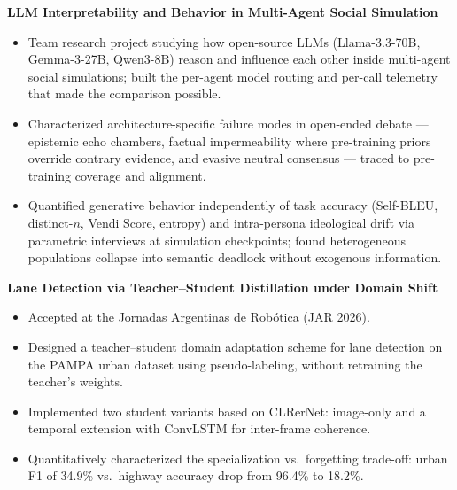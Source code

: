 \documentclass[a4paper,11pt]{article}
\begin{document}
\textbf{LLM Interpretability and Behavior in Multi-Agent Social Simulation}
\begin{itemize}
    \item Team research project studying how open-source LLMs (Llama-3.3-70B, Gemma-3-27B, Qwen3-8B) reason and influence each other inside multi-agent social simulations; built the per-agent model routing and per-call telemetry that made the comparison possible.
    \item Characterized architecture-specific failure modes in open-ended debate --- epistemic echo chambers, factual impermeability where pre-training priors override contrary evidence, and evasive neutral consensus --- traced to pre-training coverage and alignment.
    \item Quantified generative behavior independently of task accuracy (Self-BLEU, distinct-$n$, Vendi Score, entropy) and intra-persona ideological drift via parametric interviews at simulation checkpoints; found heterogeneous populations collapse into semantic deadlock without exogenous information.
\end{itemize}

\textbf{Lane Detection via Teacher--Student Distillation under Domain Shift}
\begin{itemize}
    \item Accepted at the Jornadas Argentinas de Robótica (JAR 2026).
    \item Designed a teacher--student domain adaptation scheme for lane detection on the PAMPA urban dataset using pseudo-labeling, without retraining the teacher's weights.
    \item Implemented two student variants based on CLRerNet: image-only and a temporal extension with ConvLSTM for inter-frame coherence.
    \item Quantitatively characterized the specialization vs.\ forgetting trade-off: urban F1 of 34.9\% vs.\ highway accuracy drop from 96.4\% to 18.2\%.
\end{itemize}

\end{document}
